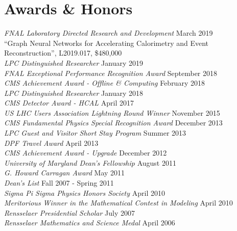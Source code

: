 \section{Awards \& Honors}
{\sl FNAL Laboratory Directed Research and Development} \hfill March 2019\\
``Graph Neural Networks for Accelerating Calorimetry and Event Reconstruction'', L2019.017, \$480,000\\
{\sl LPC Distinguished Researcher} \hfill January 2019\\
{\sl FNAL Exceptional Performance Recognition Award} \hfill September 2018\\
{\sl CMS Achievement Award - Offline \& Computing} \hfill February 2018\\
{\sl LPC Distinguished Researcher} \hfill January 2018\\
{\sl CMS Detector Award - HCAL } \hfill April 2017\\
\ifdefined\longflag
{\sl US LHC Users Association Lightning Round Winner} \hfill November 2015\\
\fi
{\sl CMS Fundamental Physics Special Recognition Award} \hfill December 2013\\
\ifdefined\longestflag
{\sl LPC Guest and Visitor Short Stay Program} \hfill Summer 2013\\
{\sl DPF Travel Award} \hfill April 2013\\
\fi
{\sl CMS Achievement Award - Upgrade} \hfill December 2012\\
\ifdefined\longerflag
{\sl University of Maryland Dean's Fellowship} \hfill August 2011\\
\fi
{\sl G. Howard Carragan Award} \hfill May 2011%
\ifdefined\longflag
\\
\ifdefined\longerflag
{\sl Dean's List} \hfill Fall 2007 - Spring 2011\\
\fi
{\sl Sigma Pi Sigma Physics Honors Society} \hfill April 2010\\
{\sl Meritorious Winner in the Mathematical Contest in Modeling} \hfill April 2010\\
{\sl Rensselaer Presidential Scholar} \hfill July 2007%
\ifdefined\longerflag
\\
{\sl Rensselaer Mathematics and Science Medal} \hfill April 2006%
\fi
\fi